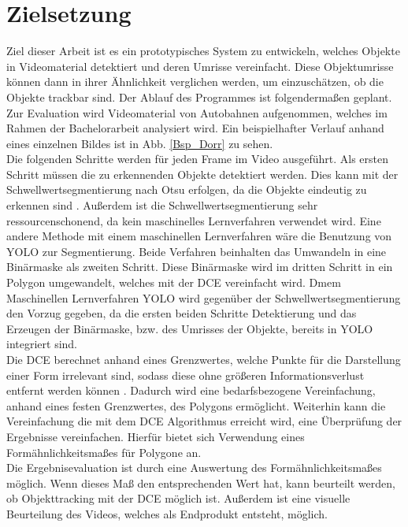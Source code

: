 \section{Zielsetzung}{ 
Ziel dieser Arbeit ist es ein prototypisches System zu entwickeln, welches Objekte in Videomaterial detektiert und deren Umrisse vereinfacht. Diese Objektumrisse können dann in ihrer Ähnlichkeit verglichen werden, um einzuschätzen, ob die Objekte trackbar sind. Der Ablauf des Programmes ist folgendermaßen geplant. \\ 
Zur Evaluation wird Videomaterial von Autobahnen aufgenommen, welches im Rahmen der Bachelorarbeit analysiert wird. Ein beispielhafter Verlauf anhand eines einzelnen Bildes ist in Abb. \ref{Bsp_Dorr} zu sehen. \\
Die folgenden Schritte werden für jeden Frame im Video ausgeführt. 
Als ersten Schritt müssen die zu erkennenden Objekte detektiert werden. Dies kann mit der Schwellwertsegmentierung nach Otsu erfolgen, da die Objekte eindeutig zu erkennen sind \citep{Otsu1979}. Außerdem ist die Schwellwertsegmentierung sehr ressourcenschonend, da kein maschinelles Lernverfahren verwendet wird. Eine andere Methode mit einem maschinellen Lernverfahren wäre die Benutzung von YOLO zur Segmentierung. Beide Verfahren beinhalten das Umwandeln in eine Binärmaske als zweiten Schritt. Diese Binärmaske wird im dritten Schritt in ein Polygon umgewandelt, welches mit der DCE vereinfacht wird. Dmem Maschinellen Lernverfahren YOLO wird gegenüber der Schwellwertsegmentierung den Vorzug gegeben, da die ersten beiden Schritte Detektierung und das Erzeugen der Binärmaske, bzw. des Umrisses der Objekte, bereits in YOLO integriert sind.\\
Die DCE berechnet anhand eines Grenzwertes, welche Punkte für die Darstellung einer Form irrelevant sind, sodass diese ohne größeren Informationsverlust entfernt werden können \citep{Barkowsky2000}. Dadurch wird eine bedarfsbezogene Vereinfachung, anhand eines festen Grenzwertes, des Polygons ermöglicht. 
Weiterhin kann die Vereinfachung die mit dem DCE Algorithmus erreicht wird, eine Überprüfung der Ergebnisse vereinfachen. Hierfür bietet sich Verwendung eines Formähnlichkeitsmaßes für Polygone an. \\
Die Ergebnisevaluation ist durch eine Auswertung des Formähnlichkeitsmaßes möglich. Wenn dieses Maß den entsprechenden Wert hat, kann beurteilt werden, ob Objekttracking mit der DCE möglich ist. Außerdem ist eine visuelle Beurteilung des Videos, welches als Endprodukt entsteht, möglich.\\}

